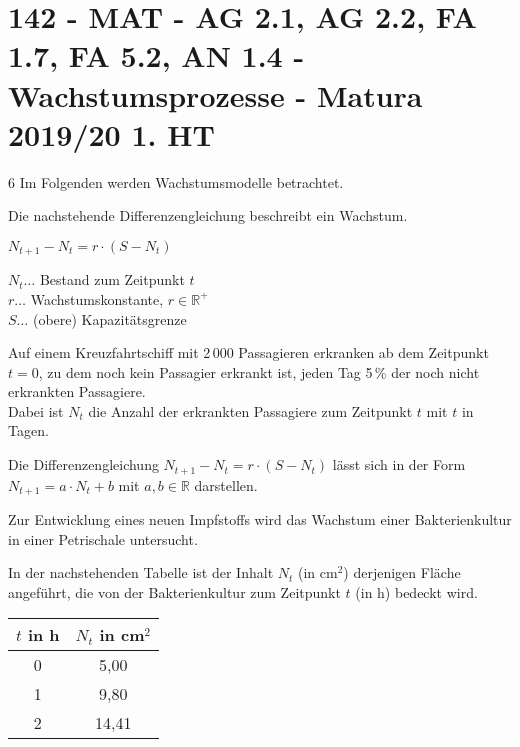 \section{142 - MAT - AG 2.1, AG 2.2, FA 1.7, FA 5.2, AN 1.4 - Wachstumsprozesse - Matura 2019/20 1. HT}

\begin{langesbeispiel}\item[6] %
Im Folgenden werden Wachstumsmodelle betrachtet.

Die nachstehende Differenzengleichung beschreibt ein Wachstum.

$N_{t+1}-N_t=r\cdot(S-N_t)$

$N_t\ldots$ Bestand zum Zeitpunkt $t$\\
$r\ldots$ Wachstumskonstante, $r\in\mathbb{R}^+$\\
$S\ldots$ (obere) Kapazitätsgrenze%

\begin{aufgabenstellung}
\item Auf einem Kreuzfahrtschiff mit 2\,000 Passagieren erkranken ab dem Zeitpunkt $t=0$, zu dem noch kein Passagier erkrankt ist, jeden Tag 5\,\% der noch nicht erkrankten Passagiere.\\
Dabei ist $N_t$ die Anzahl der erkrankten Passagiere zum Zeitpunkt $t$ mit $t$ in Tagen.%


\item Die Differenzengleichung $N_{t+1}-N_t=r\cdot(S-N_t)$ lässt sich in der Form $N_{t+1}=a\cdot N_t+b$ mit $a,b\in\mathbb{R}$ darstellen.


Zur Entwicklung eines neuen Impfstoffs wird das Wachstum einer Bakterienkultur in einer Petrischale untersucht.

In der nachstehenden Tabelle ist der Inhalt $N_t$ (in cm$^2$) derjenigen Fläche angeführt, die von der Bakterienkultur zum Zeitpunkt $t$ (in h) bedeckt wird.

\begin{center}
\begin{tabular}{|c|c|}\hline
\cellcolor[gray]{0.9}$t$ in h&\cellcolor[gray]{0.9}$N_t$ in cm$^2$\\ \hline
0&5,00\\ \hline
1&9,80\\ \hline
2&14,41\\ \hline
\end{tabular}
\end{center}


\end{aufgabenstellung}
\end{langesbeispiel}
